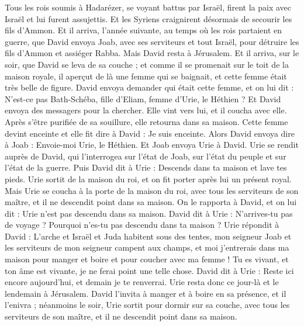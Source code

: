 \begin{multicols}{2}
Tous les rois soumis à Hadarézer, se voyant battus par Israël, firent la paix avec Israël et lui furent assujettis. Et les Syriens craignirent désormais de secourir les fils d'Ammon.
\VerseOne{}Et il arriva, l'année suivante, au temps où les rois partaient en guerre, que David envoya Joab, avec ses serviteurs et tout Israël, pour détruire les fils d'Ammon et assiéger Rabba. Mais David resta à Jérusalem.
Et il arriva, sur le soir, que David se leva de sa couche ; et comme il se promenait sur le toit de la maison royale, il aperçut de là une femme qui se baignait, et cette femme était très belle de figure.
David envoya demander qui était cette femme, et on lui dit : N'est-ce pas Bath-Schéba, fille d'Eliam, femme d'Urie, le Héthien ?
Et David envoya des messagers pour la chercher. Elle vint vers lui, et il coucha avec elle. Après s'être purifiée de sa souillure, elle retourna dans sa maison.
Cette femme devint enceinte et elle fit dire à David : Je suis enceinte.
Alors David envoya dire à Joab : Envoie-moi Urie, le Héthien. Et Joab envoya Urie à David.
Urie se rendit auprès de David, qui l'interrogea sur l'état de Joab, sur l'état du peuple et sur l'état de la guerre.
Puis David dit à Urie : Descends dans ta maison et lave tes pieds. Urie sortit de la maison du roi, et on fit porter après lui un présent royal.
Mais Urie se coucha à la porte de la maison du roi, avec tous les serviteurs de son maître, et il ne descendit point dans sa maison.
On le rapporta à David, et on lui dit : Urie n'est pas descendu dans sa maison. David dit à Urie : N'arrives-tu pas de voyage ? Pourquoi n'es-tu pas descendu dans ta maison ?
Urie répondit à David : L'arche et Israël et Juda habitent sous des tentes, mon seigneur Joab et les serviteurs de mon seigneur campent aux champs, et moi j'entrerais dans ma maison pour manger et boire et pour coucher avec ma femme ! Tu es vivant, et ton âme est vivante, je ne ferai point une telle chose.
David dit à Urie : Reste ici encore aujourd'hui, et demain je te renverrai. Urie resta donc ce jour-là et le lendemain à Jérusalem.
David l'invita à manger et à boire en sa présence, et il l'enivra ; néanmoins le soir, Urie sortit pour dormir sur sa couche, avec tous les serviteurs de son maître, et il ne descendit point dans sa maison.

\end{multicols}
